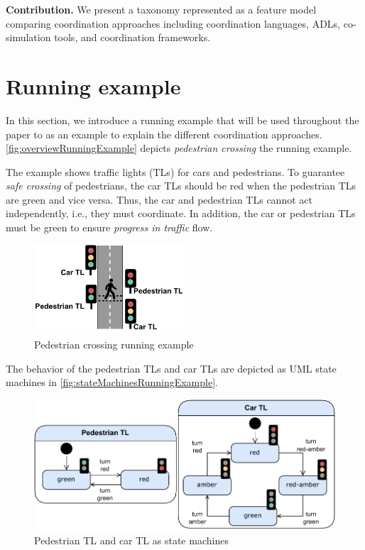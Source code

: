 \documentclass[runningheads]{llncs}
\begin{document}

\textbf{Contribution.} We present a taxonomy represented as a feature model comparing coordination approaches including coordination languages, ADLs, co-simulation tools, and coordination frameworks.

\section{Running example}
In this section, we introduce a running example that will be used throughout the paper to as an example to explain the different coordination approaches.
\autoref{fig:overviewRunningExample} depicts \textit{pedestrian crossing} the running example.

The example shows traffic lights (TLs) for cars and pedestrians.
To guarantee \textit{safe crossing} of pedestrians, the car TLs should be red when the pedestrian TLs are green and vice versa.
Thus, the car and pedestrian TLs cannot act independently, i.e., they must coordinate.
In addition, the car or pedestrian TLs must be green to ensure \textit{progress in traffic} flow.

\begin{figure}[ht]
	\centering
	\includegraphics[width=0.5\textwidth]{images/running_example_schematic}
	\caption{Pedestrian crossing running example}
	\label{fig:overviewRunningExample}
\end{figure}

The behavior of the pedestrian TLs and car TLs are depicted as UML state machines \cite{objectmanagementgroupUnifiedModelingLanguage2017} in \autoref{fig:stateMachinesRunningExample}.

\begin{figure}[ht]
	\centering
	\includegraphics[width=1\textwidth]{images/running_example_models}
	\caption{Pedestrian TL and car TL as state machines}
	\label{fig:stateMachinesRunningExample}
\end{figure}
\end{document}
